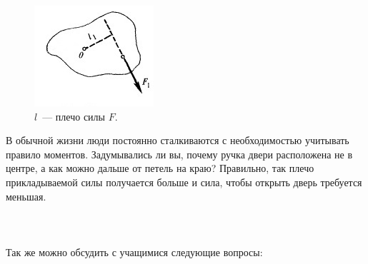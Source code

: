 \begin{figure}[h!]
	\begin{center}
		\includegraphics[width=0.3\linewidth]{chapters/chapter20/images/1}
		\caption{\(l\)~--- плечо силы \(F\).}
		\label{ris:image20x1}
	\end{center}
\end{figure}

В обычной жизни люди постоянно сталкиваются с необходимостью учитывать правило моментов. Задумывались ли вы, почему ручка двери расположена не в центре, а как можно дальше от петель на краю? Правильно, так плечо прикладываемой силы получается больше и сила, чтобы открыть дверь требуется меньшая.\\\\

\\\\

Так же можно обсудить с учащимися следующие вопросы:

